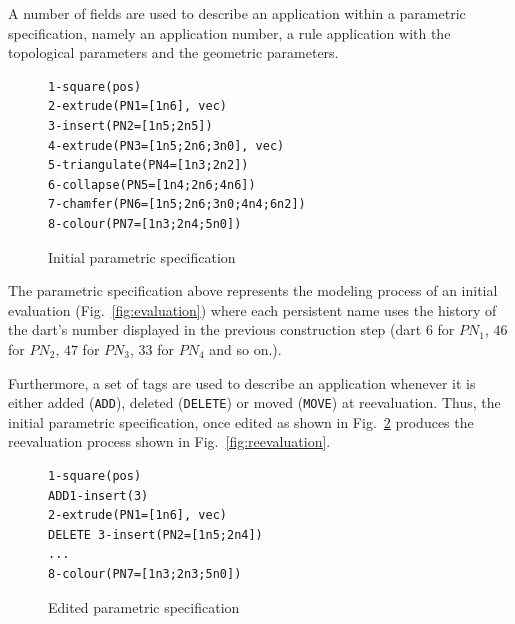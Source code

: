 A number of fields are used to describe an application within a parametric
specification, namely an application number, a rule ap\-pli\-ca\-tion with 
the topological pa\-ra\-me\-ters and the geometric parameters. %
%
\begin{figure}
    \centering
    \small
\begin{verbatim}
1-square(pos)
2-extrude(PN1=[1n6], vec)
3-insert(PN2=[1n5;2n5])
4-extrude(PN3=[1n5;2n6;3n0], vec)
5-triangulate(PN4=[1n3;2n2])
6-collapse(PN5=[1n4;2n6;4n6])
7-chamfer(PN6=[1n5;2n6;3n0;4n4;6n2])
8-colour(PN7=[1n3;2n4;5n0])
\end{verbatim}
    \caption{Initial parametric specification}
    \label{fig:init-spec}
\end{figure}
%
The parametric specification above represents the modeling process of an
initial evaluation (Fig.~\ref{fig:evaluation}) where each persistent name 
uses the history of the dart's number displayed in the previous construction
step (dart $6$ for $PN_1$, $46$ for $PN_2$, $47$ for $PN_3$, $33$ for $PN_4$
and so on.). %

Furthermore, a set of tags are used to describe an application whenever it is either
added (\texttt{ADD}), deleted (\texttt{DELETE}) or moved (\texttt{MOVE}) at
reevaluation. %
Thus, the initial parametric specification, once edited as %
shown in Fig.~\ref{fig:reval-spec}
produces the
reevaluation process 
shown in Fig.~\ref{fig:reevaluation}.
%
\begin{figure}
    \centering
    \small
\begin{verbatim}
1-square(pos)
ADD1-insert(3)
2-extrude(PN1=[1n6], vec)
DELETE 3-insert(PN2=[1n5;2n4])
...
8-colour(PN7=[1n3;2n3;5n0])
\end{verbatim}
    \caption{Edited parametric specification}
    \label{fig:reval-spec}
\end{figure}


